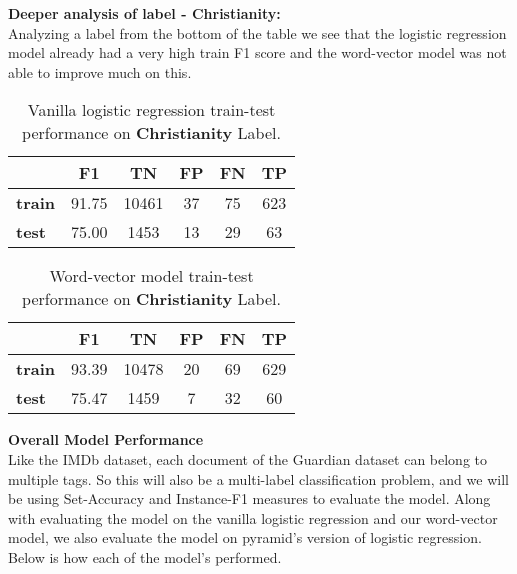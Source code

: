 \noindent \textbf{Deeper analysis of label - Christianity:}\\

Analyzing a label from the bottom of the table we see that the logistic regression model already had a very high train F1 score and the word-vector model was not able to improve much on this.

\begin{table}[htbp]
\centering
\begin{tabular}{l|c|c|c|c|c|}
 & \textbf{F1} & \textbf{TN} & \textbf{FP} & \textbf{FN} & \textbf{TP} \\ \hline
\textbf{train} & 91.75 & 10461 & 37 & 75 & 623 \\
\textbf{test} & 75.00 & 1453 & 13 & 29 & 63
\end{tabular}
\caption{\label{tab:widgets}Vanilla logistic regression train-test performance on \textbf{Christianity} Label.}
\end{table}

\begin{table}[htbp]
\centering
\begin{tabular}{l|c|c|c|c|c|}
 & \textbf{F1} & \textbf{TN} & \textbf{FP} & \textbf{FN} & \textbf{TP} \\ \hline
\textbf{train} & 93.39 & 10478 & 20 & 69 & 629 \\
\textbf{test} & 75.47 & 1459 & 7 & 32 & 60
\end{tabular}
\caption{\label{tab:widgets}Word-vector model train-test performance on \textbf{Christianity} Label.}
\end{table}

\newpage
\noindent \textbf{Overall Model Performance}\\

Like the IMDb dataset, each document of the Guardian dataset can belong to multiple tags. So this will also be a multi-label classification problem, and we will be using Set-Accuracy and Instance-F1 measures to evaluate the model. Along with evaluating the model on the vanilla logistic regression and our word-vector model, we also evaluate the model on pyramid's version of logistic regression. Below is how each of the model's performed.

